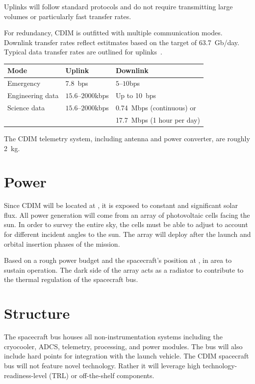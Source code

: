 \documentclass{ws-jai}
\begin{document}
Uplinks will follow standard protocols and do not require transmitting large volumes or particularly fast transfer rates.

\begin{wstable}[htp]
  \caption{For redundancy, CDIM is outfitted with multiple communication modes. Downlink transfer rates reflect estitmates based on the target of \SI{63.7}{Gb/day}. Typical data transfer rates are outlined for uplinks~\cite{smad2015}.
\label{tab:telemetry}}
  \begin{tabular}{@{}lll@{}} \toprule
    Mode & Uplink & Downlink \\ \midrule
    Emergency & \SI{7.8}{bps} & $5$--$10$\si{bps} \\
    Engineering data & $15.6$--$2000$\si{kbps} & Up to \SI{10}{bps} \\
    Science data & $15.6$--$2000$\si{kbps} & \SI{0.74}{Mbps} (continuous) or \\
    & & \SI{17.7}{Mbps} (1 hour per day)\\\bottomrule
  \end{tabular}
\end{wstable}
The CDIM telemetry system, including antenna and power converter, are roughly \SI{2}{kg}.

\section{Power}
\label{sec:power}
Since CDIM will be located at \Ltwo, it is exposed to constant and significant solar flux.
All power generation will come from an array of photovoltaic cells facing the sun.
In order to survey the entire sky, the cells must be able to adjust to account for different incident angles to the sun.
The array will deploy after the launch and orbital insertion phases of the mission.

Based on a rough power budget and the spacecraft's position at \Ltwo,  in area to sustain operation.
The dark side of the array acts as a radiator to contribute to the thermal regulation of the spacecraft bus.


\section{Structure}
\label{sec:structure}
The spacecraft bus houses all non-instrumentation systems including the cryocooler, ADCS, telemetry, processing, and power modules.
The bus will also include hard points for integration with the launch vehicle.
The CDIM spacecraft bus will not feature novel technology. Rather it will leverage high technology-readiness-level (TRL) or off-the-shelf components.
\end{document}
